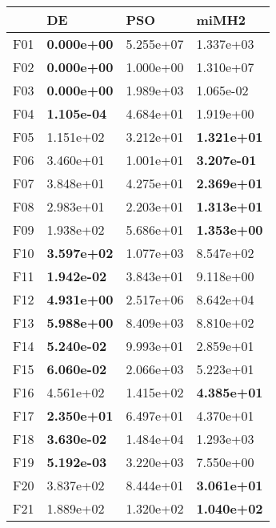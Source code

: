 \documentclass[10pt,a4paper]{article}
\begin{document}
\begin{table}[h]
	\centering
	\begin{tabular}{|l|l|l|l|}
		\hline
		& DE                 & PSO                & miMH2              \\ \hline
		F01  & \textbf{0.000e+00} & 5.255e+07          & 1.337e+03          \\
		F02  & \textbf{0.000e+00} & 1.000e+00          & 1.310e+07          \\
		F03  & \textbf{0.000e+00} & 1.989e+03          & 1.065e-02          \\
		F04  & \textbf{1.105e-04} & 4.684e+01          & 1.919e+00          \\
		F05  & 1.151e+02          & 3.212e+01          & \textbf{1.321e+01} \\
		F06  & 3.460e+01          & 1.001e+01          & \textbf{3.207e-01} \\
		F07  & 3.848e+01          & 4.275e+01          & \textbf{2.369e+01} \\
		F08  & 2.983e+01          & 2.203e+01          & \textbf{1.313e+01} \\
		F09  & 1.938e+02          & 5.686e+01          & \textbf{1.353e+00} \\
		F10  & \textbf{3.597e+02} & 1.077e+03          & 8.547e+02          \\
		F11  & \textbf{1.942e-02} & 3.843e+01          & 9.118e+00          \\
		F12  & \textbf{4.931e+00} & 2.517e+06          & 8.642e+04          \\
		F13  & \textbf{5.988e+00} & 8.409e+03          & 8.810e+02          \\
		F14  & \textbf{5.240e-02} & 9.993e+01          & 2.859e+01          \\
		F15  & \textbf{6.060e-02} & 2.066e+03          & 5.223e+01          \\
		F16  & 4.561e+02          & 1.415e+02          & \textbf{4.385e+01} \\
		F17  & \textbf{2.350e+01} & 6.497e+01          & 4.370e+01          \\
		F18  & \textbf{3.630e-02} & 1.484e+04          & 1.293e+03          \\
		F19  & \textbf{5.192e-03} & 3.220e+03          & 7.550e+00          \\
		F20  & 3.837e+02          & 8.444e+01          & \textbf{3.061e+01} \\
		F21  & 1.889e+02          & 1.320e+02          & \textbf{1.040e+02} \\

\end{tabular}
\end{table}
\end{document}
